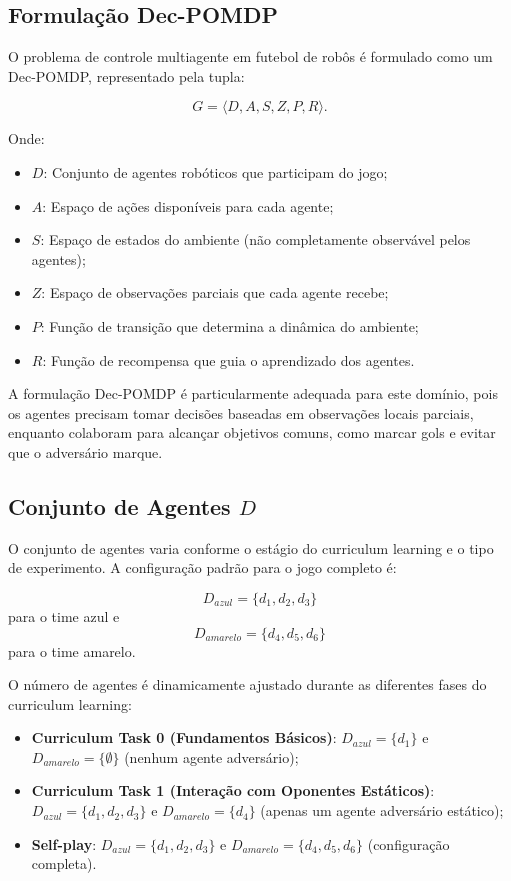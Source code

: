 \subsection{Formulação Dec-POMDP}

O problema de controle multiagente em futebol de robôs é formulado como um Dec-POMDP, representado pela tupla:

$$G = \langle D, A, S, Z, P, R \rangle.$$

Onde:
\begin{itemize}
    \item $D$: Conjunto de agentes robóticos que participam do jogo;
    \item $A$: Espaço de ações disponíveis para cada agente;
    \item $S$: Espaço de estados do ambiente (não completamente observável pelos agentes);
    \item $Z$: Espaço de observações parciais que cada agente recebe;
    \item $P$: Função de transição que determina a dinâmica do ambiente;
    \item $R$: Função de recompensa que guia o aprendizado dos agentes.
\end{itemize}

A formulação Dec-POMDP é particularmente adequada para este domínio, pois os agentes precisam tomar decisões baseadas em observações locais parciais, enquanto colaboram para alcançar objetivos comuns, como marcar gols e evitar que o adversário marque.

\subsection{Conjunto de Agentes $D$}

O conjunto de agentes varia conforme o estágio do curriculum learning e o tipo de experimento. A configuração padrão para o jogo completo é:

$$D_{azul} = \{d_1, d_2, d_3\}$$ para o time azul e $$D_{amarelo} = \{d_4, d_5, d_6\}$$ para o time amarelo.

O número de agentes é dinamicamente ajustado durante as diferentes fases do curriculum learning:

\begin{itemize}
    \item \textbf{Curriculum Task 0 (Fundamentos Básicos)}: $D_{azul} = \{d_1\}$ e $D_{amarelo} = \{\emptyset\}$ (nenhum agente adversário);
    \item \textbf{Curriculum Task 1 (Interação com Oponentes Estáticos)}: $D_{azul} = \{d_1, d_2, d_3\}$ e $D_{amarelo} = \{d_4\}$ (apenas um agente adversário estático);
    \item \textbf{Self-play}: $D_{azul} = \{d_1, d_2, d_3\}$ e $D_{amarelo} = \{d_4, d_5, d_6\}$ (configuração completa).
\end{itemize}


